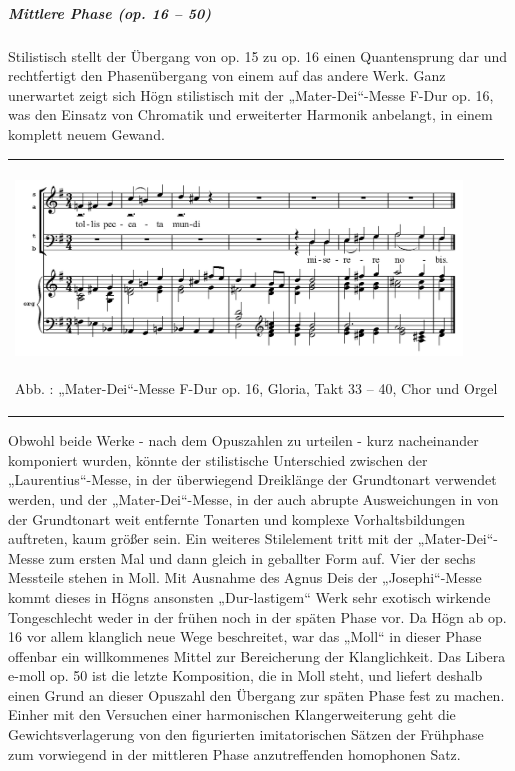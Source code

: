 \documentclass[a4paper]{article}
\newcounter{Abb}
\renewcommand\theAbb{\arabic{Abb}}
\begin{document}
\subparagraph{Mittlere Phase (op. 16 – 50)}
Stilistisch stellt der Übergang von op. 15 zu op. 16 einen Quantensprung
dar und rechtfertigt den Phasenübergang von einem auf das andere Werk.
Ganz unerwartet zeigt sich Högn stilistisch mit der „Mater-Dei“-Messe
F-Dur op. 16, was den Einsatz von Chromatik und erweiterter Harmonik
anbelangt, in einem komplett neuem Gewand.

\begin{center}
\tablefirsthead{}
\tablehead{}
\tabletail{}
\tablelasttail{}
\begin{supertabular}{m{12.027cm}}

\includegraphics[width=11.845cm,height=4.9cm]{pictures/zulassungsarbeit-img097.png}

\label{bkm:Ref99946240}Abb. \stepcounter{Abb}{\theAbb}:
„Mater-Dei“-Messe F-Dur op. 16, Gloria, Takt  33 – 40, Chor und Orgel\\
\end{supertabular}
\end{center}
Obwohl beide Werke - nach dem Opuszahlen zu urteilen - kurz nacheinander
komponiert wurden, könnte der stilistische Unterschied zwischen der
„Laurentius“-Messe, in der überwiegend Dreiklänge der Grundtonart
verwendet werden, und der „Mater-Dei“-Messe, in der auch abrupte
Ausweichungen in von der Grundtonart weit entfernte Tonarten und
komplexe Vorhaltsbildungen auftreten, kaum größer sein. Ein weiteres
Stilelement tritt mit der „Mater-Dei“-Messe zum ersten Mal und dann
gleich in geballter Form auf. Vier der sechs Messteile stehen in Moll.
Mit Ausnahme des Agnus Deis der „Josephi“-Messe kommt dieses in Högns
ansonsten „Dur-lastigem“ Werk sehr exotisch wirkende Tongeschlecht
weder in der frühen noch in der späten Phase vor. Da Högn ab op. 16 vor
allem klanglich neue Wege beschreitet, war das „Moll“ in dieser Phase
offenbar ein willkommenes Mittel zur Bereicherung der Klanglichkeit.
Das Libera e-moll op. 50 ist die letzte Komposition, die in Moll steht,
und liefert deshalb einen Grund an dieser Opuszahl den Übergang zur
späten Phase fest zu machen. Einher mit den Versuchen einer
harmonischen Klangerweiterung geht die Gewichtsverlagerung von den
figurierten imitatorischen Sätzen der Frühphase zum vorwiegend in der
mittleren Phase anzutreffenden homophonen Satz.
\end{document}

